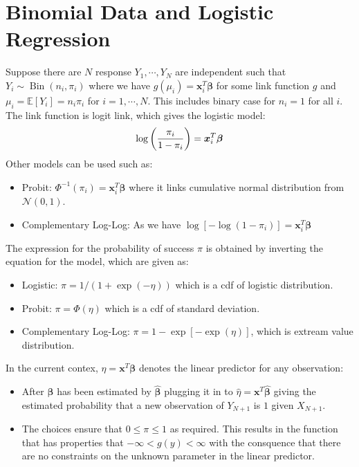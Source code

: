 \section{Binomial Data and Logistic Regression}

\begin{remark}
    Suppose there are $N$ response $Y_1,\cdots,Y_N$ are independent such that $Y_i \sim \operatorname{Bin}(n_i, \pi_i)$ where we have $g(\mu_i) = \boldsymbol x_i^T\boldsymbol \beta$ for some link function $g$ and $\mu_i = \mathbb{E}[Y_i] = n_i\pi_i$ for $i=1,\cdots,N$. This includes binary case for $n_i=1$ for all $i$. The link function is logit link, which gives the logistic model:
    \begin{equation*}
        \log\left( \frac{\pi_i}{1-\pi_i} \right) = \boldsymbol x_i^T\boldsymbol \beta
    \end{equation*} 
    Other models can be used such as:
    \begin{itemize}
        \item Probit: $\Phi^{-1}(\pi_i) = \boldsymbol x_i^T\boldsymbol \beta$ where it links cumulative normal distribution from $\mathcal{N}(0, 1)$. 
        \item Complementary Log-Log: As we have $\log[-\log(1-\pi_i)] = \boldsymbol x_i^T\boldsymbol \beta$
    \end{itemize}
    The expression for the probability of success $\pi$ is obtained by inverting the equation for the model, which are given as:
    \begin{itemize}
        \item Logistic: $\pi = 1/(1 + \exp(-\eta))$ which is a cdf of logistic distribution. 
        \item Probit: $\pi = \Phi(\eta)$ which is a cdf of standard deviation. 
        \item Complementary Log-Log: $\pi = 1 - \exp[-\exp(\eta)]$, which is extream value distribution.
    \end{itemize}
\end{remark}

\begin{remark}
    In the current contex, $\eta = \boldsymbol x^T\boldsymbol \beta$ denotes the linear predictor for any observation: 
    \begin{itemize}
        \item After $\boldsymbol \beta$ has been estimated by $\hat{\boldsymbol \beta}$ plugging it in to $\hat{\eta} = \boldsymbol x^T\hat{\boldsymbol \beta}$ giving the estimated probability that a new observation of $Y_{N+1}$ is $1$ given $X_{N+1}$.
        \item The choices ensure that $0\le\pi\le1$ as required. This results in the function that has properties that $-\infty<g(y)<\infty$ with the consquence that there are no constraints on the unknown parameter in the linear predictor. 
    \end{itemize}
\end{remark}

